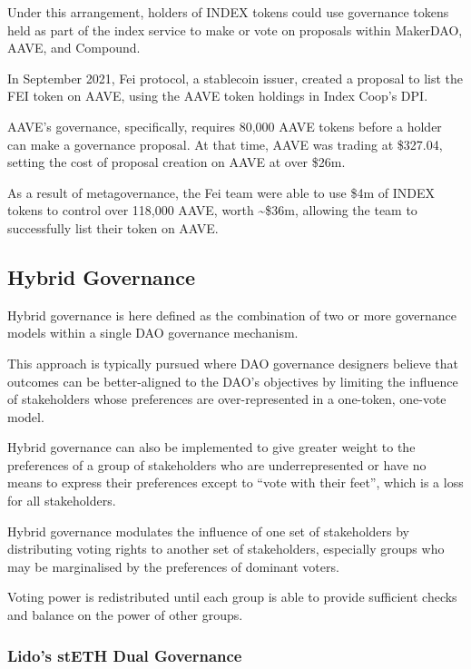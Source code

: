 \documentclass[
]{article}
\begin{document}
Under this arrangement, holders of INDEX tokens could use governance
tokens held as part of the index service to make or vote on proposals
within MakerDAO, AAVE, and Compound.

In September 2021, Fei protocol, a stablecoin issuer, created a proposal
to list the FEI token on AAVE, using the AAVE token holdings in Index
Coop's DPI.

AAVE's governance, specifically, requires 80,000 AAVE tokens before a
holder can make a governance proposal. At that time, AAVE was trading at
\$327.04, setting the cost of proposal creation on AAVE at over \$26m.

As a result of metagovernance, the Fei team were able to use \$4m of
INDEX tokens to control over 118,000 AAVE, worth \textasciitilde\$36m,
allowing the team to successfully list their token on AAVE.

\hypertarget{hybrid-governance}{%
\subsection{Hybrid Governance}\label{hybrid-governance}}

Hybrid governance is here defined as the combination of two or more
governance models within a single DAO governance mechanism.

This approach is typically pursued where DAO governance designers
believe that outcomes can be better-aligned to the DAO's objectives by
limiting the influence of stakeholders whose preferences are
over-represented in a one-token, one-vote model.

Hybrid governance can also be implemented to give greater weight to the
preferences of a group of stakeholders who are underrepresented or have
no means to express their preferences except to ``vote with their
feet'', which is a loss for all stakeholders.

Hybrid governance modulates the influence of one set of stakeholders by
distributing voting rights to another set of stakeholders, especially
groups who may be marginalised by the preferences of dominant voters.

Voting power is redistributed until each group is able to provide
sufficient checks and balance on the power of other groups.

\hypertarget{lidos-steth-dual-governance}{%
\subsubsection{Lido's stETH Dual
Governance}\label{lidos-steth-dual-governance}}
\end{document}
